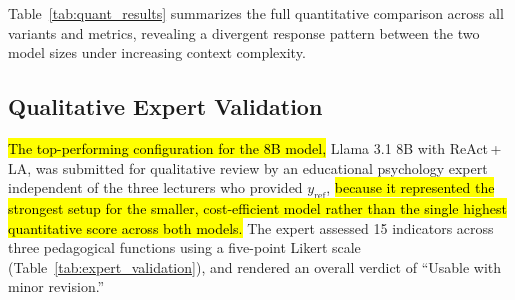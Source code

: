 \documentclass[conference,a4paper]{IEEEtran}
\begin{document}
Table~\ref{tab:quant_results} summarizes the full
quantitative comparison across all variants and metrics,
revealing a divergent response pattern between the
two model sizes under increasing context complexity.

\subsection{Qualitative Expert Validation}

\hl{The top-performing configuration for the 8B model,}
Llama 3.1 8B with ReAct\,+\,LA, was submitted for
qualitative review by an educational psychology
expert independent of the three lecturers who
provided $y_{\text{ref}}$, \hl{because it represented
the strongest setup for the smaller, cost-efficient
model rather than the single highest quantitative
score across both models.} The expert assessed 15
indicators across three pedagogical functions
using a five-point Likert scale
(Table~\ref{tab:expert_validation}), and rendered
an overall verdict of ``Usable with minor
revision.''


\end{document}
